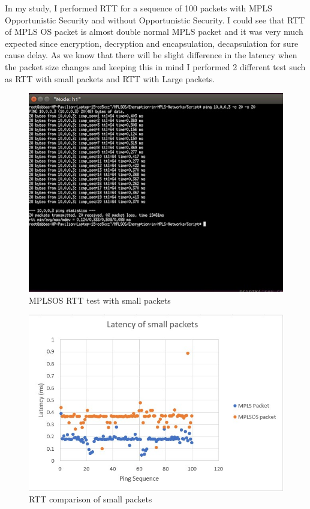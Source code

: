 In my study, I performed RTT for a sequence of 100 packets with MPLS Opportunistic Security and without Opportunistic Security. I could see that RTT of MPLS OS packet is almost double normal MPLS packet and it was very much expected since encryption, decryption and encapsulation, decapsulation for sure cause delay. As we know that there will be slight difference in the latency when the packet size changes and keeping this in mind I performed 2 different test such as RTT with small packets and RTT with Large packets.\\

\begin{figure}
       \centering\includegraphics[width=\textwidth]{Final/MPLSOS_Small.jpg}
       \caption{MPLSOS RTT test with small packets}
       \label{fig:compbest}
\end{figure}

\begin{figure}
       \centering\includegraphics[width=\textwidth]{Final/Latency_small.jpg}
       \caption{RTT comparison of small packets}
       \label{fig:compbest}
\end{figure}


